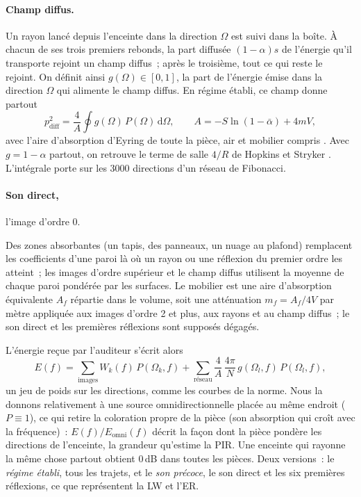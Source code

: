 \documentclass[11pt,a4paper]{article}
\newcommand{\dd}{\,\mathrm{d}}
\begin{document}
\paragraph{Champ diffus.} Un rayon lancé depuis l'enceinte dans la direction $\Omega$ est suivi dans la
boîte. À chacun de ses trois premiers rebonds, la part diffusée $(1 - \alpha)s$ de l'énergie qu'il
transporte rejoint un champ diffus~; après le troisième, tout ce qui reste le rejoint. On définit ainsi
$g(\Omega) \in [0, 1]$, la part de l'énergie émise dans la direction $\Omega$ qui alimente le champ diffus.
En régime établi, ce champ donne partout
\begin{equation}
p^2_{\mathrm{diff}} = \frac{4}{A}\oint g(\Omega)\,P(\Omega)\dd\Omega, \qquad
A = -S\ln(1 - \bar\alpha) + 4 m V,
\end{equation}
avec l'aire d'absorption d'Eyring de toute la pièce, air et mobilier compris \cite{kuttruff2016}. Avec
$g = 1 - \alpha$ partout, on retrouve le terme de salle $4/R$ de Hopkins et Stryker \cite{hopkins1948}.
L'intégrale porte sur les 3000 directions d'un réseau de Fibonacci.

\paragraph{Son direct,} l'image d'ordre 0.

Des zones absorbantes (un tapis, des panneaux, un nuage au plafond) remplacent les coefficients d'une
paroi là où un rayon ou une réflexion du premier ordre les atteint~; les images d'ordre supérieur et le
champ diffus utilisent la moyenne de chaque paroi pondérée par les surfaces. Le mobilier est une aire
d'absorption équivalente $A_f$ répartie dans le volume, soit une atténuation $m_f = A_f / 4V$ par mètre
appliquée aux images d'ordre 2 et plus, aux rayons et au champ diffus~; le son direct et les premières
réflexions sont supposés dégagés.

L'énergie reçue par l'auditeur s'écrit alors
\begin{equation}
E(f) = \sum_{\text{images}} W_k(f)\,P(\Omega_k, f) + \sum_{\text{réseau}} \frac{4}{A}\,\frac{4\pi}{N}\,g(\Omega_l, f)\,P(\Omega_l, f),
\end{equation}
un jeu de poids sur les directions, comme les courbes de la norme. Nous la donnons relativement à une
source omnidirectionnelle placée au même endroit ($P \equiv 1$), ce qui retire la coloration propre de
la pièce (son absorption qui croît avec la fréquence)~: $E(f) / E_{\mathrm{omni}}(f)$ décrit la façon dont
la pièce pondère les directions de l'enceinte, la grandeur qu'estime la PIR. Une enceinte qui rayonne
la même chose partout obtient 0\,dB dans toutes les pièces. Deux versions~: le \emph{régime établi},
tous les trajets, et le \emph{son précoce}, le son direct et les six premières réflexions, ce que
représentent la LW et l'ER.
\end{document}
